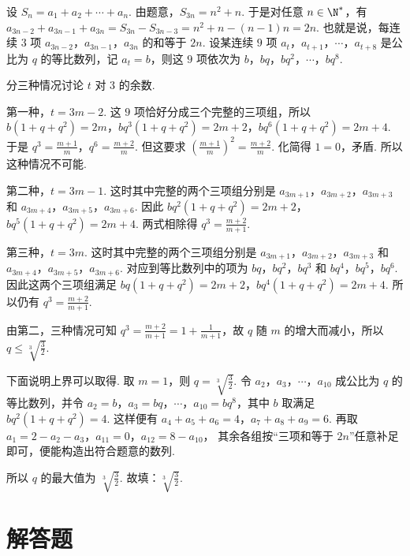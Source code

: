 \documentclass[UTF8,a4paper,oneside,11pt]{ctexbook}
\begin{document}
\begin{solution}
设 \(S_n=a_1+a_2+\cdots+a_n\). 由题意，\(S_{3n}=n^2+n\). 于是对任意 \(n\in\N^*\)，有 \(a_{3n-2}+a_{3n-1}+a_{3n}=S_{3n}-S_{3n-3}=n^2+n-\left( n-1 \right)n=2n\).
也就是说，每连续 \(3\) 项 \(a_{3n-2}\)，\(a_{3n-1}\)，\(a_{3n}\) 的和等于 \(2n\).
设某连续 \(9\) 项 \(a_t\)，\(a_{t+1}\)，\(\cdots\)，\(a_{t+8}\) 是公比为 \(q\) 的等比数列，记 \(a_t=b\)，则这 \(9\) 项依次为 \(b\)，\(bq\)，\(bq^2\)，\(\cdots\)，\(bq^8\).

分三种情况讨论 \(t\) 对 \(3\) 的余数.

第一种，\(t=3m-2\). 这 \(9\) 项恰好分成三个完整的三项组，所以 \(b\left( 1+q+q^2 \right)=2m\)，\(bq^3\left( 1+q+q^2 \right)=2m+2\)，\(bq^6\left( 1+q+q^2 \right)=2m+4\). 于是 \(q^3=\frac{m+1}{m}\)，\(q^6=\frac{m+2}{m}\). 但这要求 \(\left( \frac{m+1}{m} \right)^2=\frac{m+2}{m}\).
化简得 \(1=0\)，矛盾. 所以这种情况不可能.

第二种，\(t=3m-1\). 这时其中完整的两个三项组分别是 \(a_{3m+1}\)，\(a_{3m+2}\)，\(a_{3m+3}\) 和 \(a_{3m+4}\)，\(a_{3m+5}\)，\(a_{3m+6}\). 因此 \(bq^2\left( 1+q+q^2 \right)=2m+2\)，\(bq^5\left( 1+q+q^2 \right)=2m+4\). 两式相除得 \(q^3=\frac{m+2}{m+1}\).

第三种，\(t=3m\). 这时其中完整的两个三项组分别是 \(a_{3m+1}\)，\(a_{3m+2}\)，\(a_{3m+3}\) 和 \(a_{3m+4}\)，\(a_{3m+5}\)，\(a_{3m+6}\). 对应到等比数列中的项为 \(bq\)，\(bq^2\)，\(bq^3\) 和 \(bq^4\)，\(bq^5\)，\(bq^6\). 因此这两个三项组满足 \(bq\left( 1+q+q^2 \right)=2m+2\)，\(bq^4\left( 1+q+q^2 \right)=2m+4\). 所以仍有 \(q^3=\frac{m+2}{m+1}\).

由第二，三种情况可知 \(q^3=\frac{m+2}{m+1}=1+\frac{1}{m+1}\)，故 \(q\) 随 \(m\) 的增大而减小，所以 \(q\le \sqrt[3]{\frac{3}{2}}\).

下面说明上界可以取得. 取 \(m=1\)，则 \(q=\sqrt[3]{\frac{3}{2}}\). 令 \(a_2\)，\(a_3\)，\(\cdots\)，\(a_{10}\) 成公比为 \(q\) 的等比数列，并令 \(a_2=b\)，\(a_3=bq\)，\(\cdots\)，\(a_{10}=bq^8\)，其中 \(b\) 取满足 \(bq^2\left( 1+q+q^2 \right)=4\).
这样便有 \(a_4+a_5+a_6=4\)，\(a_7+a_8+a_9=6\). 再取 \(a_1=2-a_2-a_3\)，\(a_{11}=0\)，\(a_{12}=8-a_{10}\)，
其余各组按“三项和等于 \(2n\)”任意补足即可，便能构造出符合题意的数列.

所以 \(q\) 的最大值为 \(\sqrt[3]{\frac{3}{2}}\). 故填：\(\sqrt[3]{\frac{3}{2}}\).
\end{solution}
\section{解答题}
\end{document}
